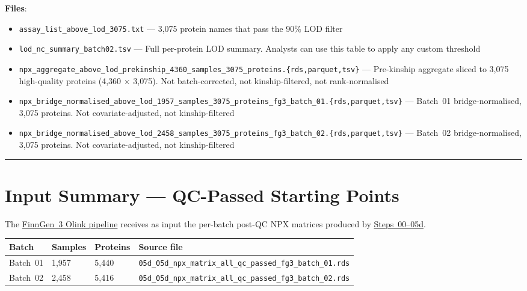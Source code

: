 \documentclass[11pt,a4paper]{article}
\newcommand{\pipelinelink}{%
  \href{https://github.com/FINNGEN/FinnGen3-proteomics-pipeline}%
       {FinnGen~3 Olink pipeline}}
\begin{document}
\textbf{Files}:
\begin{itemize}
  \item \texttt{assay\_list\_above\_lod\_3075.txt}
        --- 3,075 protein names that pass the 90\% LOD filter
  \item \texttt{lod\_nc\_summary\_batch02.tsv}
        --- Full per-protein LOD summary. Analysts can use this table
        to apply any custom threshold
  \item \texttt{npx\_aggregate\_above\_lod\_prekinship\_4360\allowbreak\_samples\_3075\_proteins.\{rds,parquet,tsv\}}
        --- Pre-kinship aggregate sliced to 3,075 high-quality proteins
        (4,360 $\times$ 3,075). Not batch-corrected, not kinship-filtered, not rank-normalised
  \item \texttt{npx\_bridge\_normalised\_above\_lod\_1957\allowbreak\_samples\_3075\_proteins\_fg3\_batch\_01.\{rds,parquet,tsv\}}
        --- Batch~01 bridge-normalised, 3,075 proteins.
        Not covariate-adjusted, not kinship-filtered
  \item \texttt{npx\_bridge\_normalised\_above\_lod\_2458\allowbreak\_samples\_3075\_proteins\_fg3\_batch\_02.\{rds,parquet,tsv\}}
        --- Batch~02 bridge-normalised, 3,075 proteins.
        Not covariate-adjusted, not kinship-filtered
\end{itemize}

\vspace{0.5cm}
\noindent\rule{\linewidth}{0.5pt}
\vspace{0.5cm}

\section{Input Summary --- QC-Passed Starting Points}

The \pipelinelink{} receives as input the per-batch post-QC NPX matrices
produced by \href{https://github.com/FINNGEN/FinnGen3-proteomics-pipeline#pipeline-steps}{Steps~00--05d}.

{\footnotesize
\renewcommand{\arraystretch}{1.2}
\begin{longtable}{p{2cm}p{2cm}p{2cm}p{7.5cm}}
\toprule
\textbf{Batch} & \textbf{Samples} & \textbf{Proteins} & \textbf{Source file} \\
\midrule
Batch~01 & 1,957 & 5,440
  & \texttt{05d\_05d\_npx\_matrix\_all\_qc\_passed\allowbreak\_fg3\_batch\_01.rds} \\
Batch~02 & 2,458 & 5,416
  & \texttt{05d\_05d\_npx\_matrix\_all\_qc\_passed\allowbreak\_fg3\_batch\_02.rds} \\
\bottomrule
\end{longtable}
\renewcommand{\arraystretch}{1.0}
}
\end{document}

